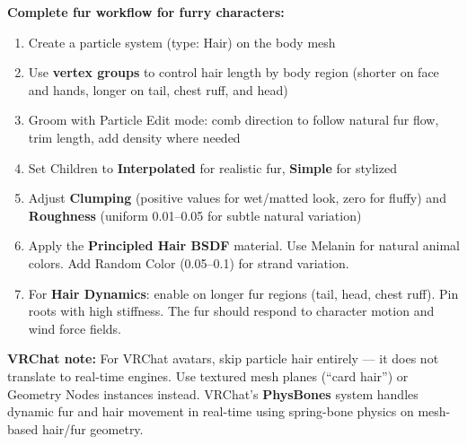 \begin{furrybox}
\textbf{Complete fur workflow for furry characters:}

\begin{enumerate}[leftmargin=1.5em]
  \item Create a particle system (type: Hair) on the body mesh
  \item Use \textbf{vertex groups} to control hair length by body region (shorter on face and hands, longer on tail, chest ruff, and head)
  \item Groom with Particle Edit mode: comb direction to follow natural fur flow, trim length, add density where needed
  \item Set Children to \textbf{Interpolated} for realistic fur, \textbf{Simple} for stylized
  \item Adjust \textbf{Clumping} (positive values for wet/matted look, zero for fluffy) and \textbf{Roughness} (uniform 0.01--0.05 for subtle natural variation)
  \item Apply the \textbf{Principled Hair BSDF} material. Use Melanin for natural animal colors. Add Random Color (0.05--0.1) for strand variation.
  \item For \textbf{Hair Dynamics}: enable on longer fur regions (tail, head, chest ruff). Pin roots with high stiffness. The fur should respond to character motion and wind force fields.
\end{enumerate}

\textbf{VRChat note:} For VRChat avatars, skip particle hair entirely --- it does not translate to real-time engines. Use textured mesh planes (``card hair'') or Geometry Nodes instances instead. VRChat's \textbf{PhysBones} system handles dynamic fur and hair movement in real-time using spring-bone physics on mesh-based hair/fur geometry.
\end{furrybox}

